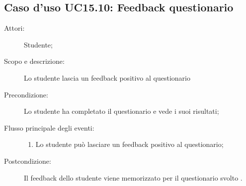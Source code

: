 \subsection{Caso d'uso UC15.10: Feedback questionario}\begin{description}
\item[Attori:] Studente;
\item[Scopo e descrizione:] Lo studente lascia un feedback positivo al questionario
      \item[Precondizione:] Lo studente ha completato il questionario e vede i suoi risultati;

        \item[Flusso principale degli eventi:] \begin{enumerate}
          \item Lo studente può lasciare un feedback positivo al questionario;

      \end{enumerate}
    \item[Postcondizione:] Il feedback dello studente viene memorizzato per il questionario svolto .
  \end{description}
\hypertarget{UC16}{}
